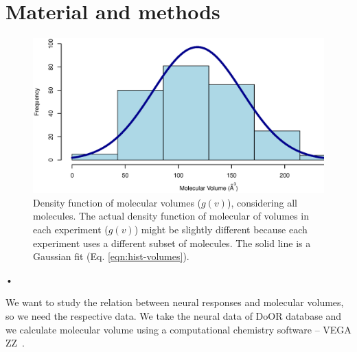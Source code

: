 \documentclass[11pt]{paper} %
\begin{document}












\section{Material and methods}
\begin{figure}
	\centering
	\includegraphics[width=0.5 \textwidth]{fig/hist-volumes}
	\caption{Density function of molecular volumes ($g(v)$), considering all molecules. 
		The actual density function of molecular of volumes in each experiment ($g(v)$) might be slightly different 
		because each experiment uses a different subset of molecules. 
		The solid line is a Gaussian fit (Eq. \ref{eqn:hist-volumes}).}
	\label{fig:hist-volumes}
\end{figure}•

We want to study the relation between neural responses and molecular volumes, so we need the respective data. 
We take the neural data of DoOR database \cite{Galizia2010} and we calculate molecular volume using a computational chemistry software -- VEGA ZZ~\cite{}. 
\end{document}
